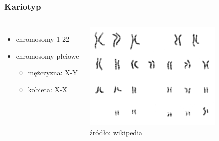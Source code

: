 \documentclass[table]{beamer}
\begin{document}
\begin{frame}\frametitle{Kariotyp}
 \begin{columns}    
\begin{itemize}
\item chromosomy 1-22
\item chromosomy płciowe
\begin{itemize}
\item mężczyzna: X-Y
\item kobieta: X-X
\end{itemize}
\end{itemize}
	    \begin{center}
	   \includegraphics[width=0.9 \textwidth]{SER-images/karyotype.png}\\
	   \tiny{źródło: wikipedia}  
	    \end{center}
\end{columns}
\end{frame}
\end{document}
